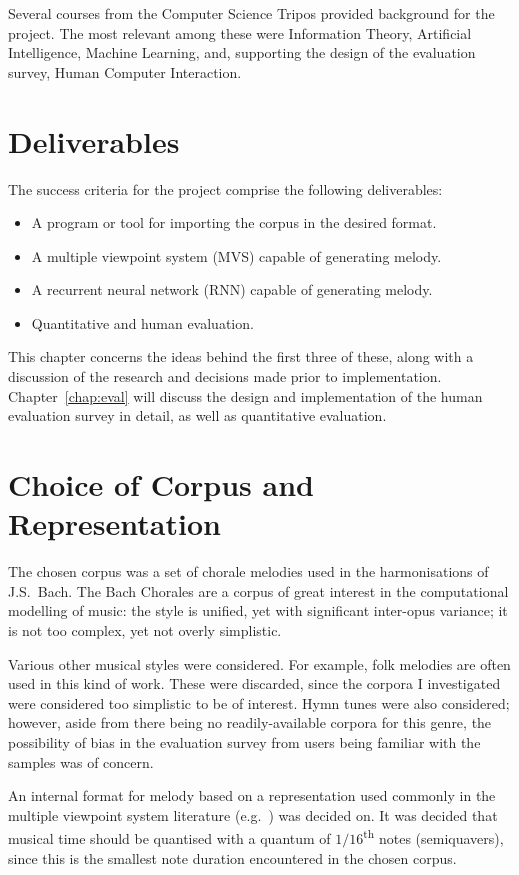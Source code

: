 \documentclass[12pt,a4paper,twoside,openright]{report}
\begin{document}
Several courses from the Computer Science Tripos provided background for the
project. The most relevant among these were Information Theory, Artificial
Intelligence, Machine Learning, and, supporting the design of the
evaluation survey, Human Computer Interaction. 

\section{Deliverables}

The success criteria for the project comprise the following deliverables:
\begin{itemize}
  \item A program or tool for importing the corpus in the desired format.
  \item A multiple viewpoint system (MVS) capable of generating melody.
  \item A recurrent neural network (RNN) capable of generating melody.
  \item Quantitative and human evaluation.
\end{itemize}

This chapter concerns the ideas behind the first three of these, along with
a discussion of the research and decisions made prior to implementation.
Chapter~\ref{chap:eval} will discuss the design and implementation of the
human evaluation survey in detail, as well as quantitative evaluation.

\section{Choice of Corpus and Representation}\label{sec:corp-rep}

The chosen corpus was a set of chorale melodies used in the harmonisations of
J.S.\ Bach. The Bach Chorales are a corpus of great interest in the
computational modelling of music: the style is unified, yet with significant
inter-opus variance; it is not too complex, yet not overly simplistic.

Various other musical styles were considered. For example, folk melodies are
often used in this kind of work. These were discarded, since the corpora I
investigated were considered too simplistic to be of interest. Hymn tunes were
also considered; however, aside from there being no readily-available corpora
for this genre, the possibility of bias in the evaluation survey from users being
familiar with the samples was of concern.

An internal format for melody based on a representation used commonly in the
multiple viewpoint system literature (e.g.\ \cite{conklin1995viewpoints}) was
decided on. It was decided that musical time should be quantised with a quantum
of $1/16$\textsuperscript{th} notes (semiquavers), since this is the smallest
note duration encountered in the chosen corpus.
\end{document}
